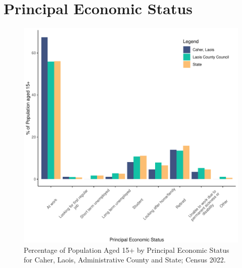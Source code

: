 \documentclass{article}
\begin{document}
  
\pagebreak
\section{Principal Economic Status}\label{sect:PES}
\begin{figure}[H]
	\centering
	\includegraphics[width = 140mm]{../figures/PESED.pdf}
	\caption{Percentage of Population Aged 15+ by Principal Economic Status for Caher, Laois, Administrative County and State; Census 2022.}
	\label{fig:vbnv}
	\end{figure}
\end{document}

